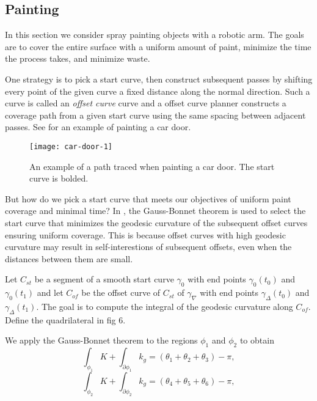 \subsection{Painting}
\label{sec:painting-cars}



In this section we consider spray painting objects with a robotic arm.
The goals are to cover the entire surface with a uniform amount
of paint, minimize the time the process takes, and minimize waste.

One strategy is to pick a start curve, then construct subsequent passes 
by shifting every point of the given curve a fixed distance along the
normal direction. Such a curve is called an \emph{offset curve} curve and
a offset curve planner constructs a coverage path from a given
start curve using the same spacing between adjacent passes.
See 
for an example of painting a car door.


\begin{figure}[htb]
        \centering
        \texttt{[image: car-door-1]}
		\caption{An example of a path traced when painting a car door.
		The start curve is bolded.
		\label{fig:car-door}}
\end{figure}

But how do we pick a start curve that meets our objectives of uniform paint coverage 
and minimal time?
In \cite{atkar_towards_2003,atkar_uniform_2005}, 
 the Gauss-Bonnet theorem is used to  select the 
start curve that minimizes the geodesic curvature of the
subsequent offset curves 
 ensuring uniform coverage.
 This is because offset curves with high geodesic curvature may result in self-interestions
 of subsequent offsets, even when the distances between them are small.


Let $C_{st}$  be a segment of a smooth start curve $\gamma_0$
with end points $\gamma_0(t_0)$ and $\gamma_0(t_1)$ and let
$C_{of}$ be the offset curve of $C_{st}$ of $\gamma_\nabla$
with end points $\gamma_\Delta(t_0)$ and $\gamma_\Delta(t_1).$
The goal is to compute the integral of the geodesic curvature along $C_{of}.$
Define the quadrilateral in fig 6.

We apply the Gauss-Bonnet theorem to the regions $\phi_1$ and $\phi_2$ to
obtain
\begin{equation}\label{eqn:phi-1}
\int_{\phi_1}K+\int_{\partial\phi_1}k_g=(\theta_1+\theta_2+\theta_3)-\pi,
\end{equation}
\begin{equation}\label{eqn:phi-2}
\int_{\phi_2}K+\int_{\partial\phi_2}k_g=(\theta_4+\theta_5+\theta_6)-\pi,
\end{equation}

